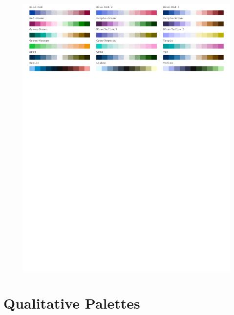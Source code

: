 \vspace{2em}

\begin{figure}[H]
\centering
\includegraphics[width = \textwidth, trim= 0 8in 0 0, clip]{graphics/appFigs/hcl_pals_div.pdf}
\end{figure}

\section{Qualitative Palettes}

\vspace{2em}

